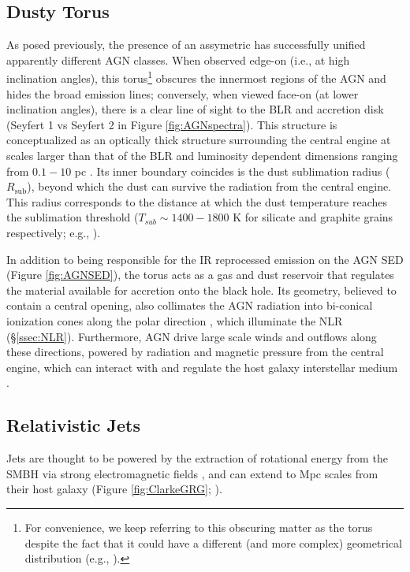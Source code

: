 \subsection{Dusty Torus}
\label{ssec:Torus}
As posed previously, the presence of an assymetric  has successfully unified apparently different AGN classes. When observed edge-on (i.e., at high inclination angles), this torus\footnote{For convenience, we keep referring to this obscuring matter as the torus despite the fact that it could have a different (and more complex) geometrical distribution (e.g., \cites{Nenkova2008ClumpyTorus}{Stalevski2012TwoMediumTorus}).} obscures the innermost regions of the AGN and hides the broad emission lines; conversely, when viewed face-on (at lower inclination angles), there is a clear line of sight to the BLR and accretion disk (Seyfert 1 vs Seyfert 2 in Figure \ref{fig:AGNspectra}). This structure is conceptualized as an optically thick structure surrounding the central engine at scales larger than that of the BLR and luminosity dependent dimensions ranging from $0.1-10$ pc \parencite{Netzer2015AnnRev}. Its inner boundary coincides is the dust sublimation radius ($R_\mathrm{sub}$), beyond which the dust can survive the radiation from the central engine. This radius corresponds to the distance at which the dust temperature reaches the sublimation threshold ($T_{sub} \sim 1400-1800$ K for silicate and graphite grains respectively; e.g., \cites{Barvainis1987DustSublimation}{Netzer2015AnnRev}). 

In addition to being responsible for the IR reprocessed emission on the AGN SED (Figure \ref{fig:AGNSED}), the torus acts as a gas and dust reservoir that regulates the material available for accretion onto the black hole. Its geometry, believed to contain a central opening, also collimates the AGN radiation into bi-conical ionization cones along the polar direction \parencite{Pogge1988IonizationCones}, which illuminate the NLR (\S \ref{ssec:NLR}). Furthermore, AGN drive large scale winds and outflows along these directions, powered by radiation and magnetic pressure from the central engine, which can interact with and regulate the host galaxy interstellar medium \parencite{Ricci2026unificationmodelsactivegalactic}. 

\subsection{Relativistic Jets}
\label{ssec:Jets}
Jets are thought to be powered by the extraction of rotational energy from the SMBH via strong electromagnetic fields \parencite{Blandford1977JetMechanism}, and can extend to Mpc scales from their host galaxy (Figure \ref{fig:ClarkeGRG}; \cite{Clarke2017GiantJettedGalaxy}). 

